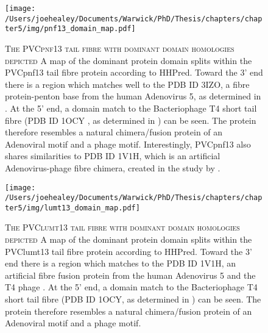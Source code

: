 \begin{figure}[h]
	\centering
	\texttt{[image: /Users/joehealey/Documents/Warwick/PhD/Thesis/chapters/chapter5/img/pnf13\_domain\_map.pdf]}
	\captionsetup{singlelinecheck=off, justification=justified, font=footnotesize, aboveskip=0pt}
	\caption[The domain structure of the PVCpnf13 tail fibre protein]{\textsc{\normalsize The PVCpnf13 tail fibre with dominant domain homologies depicted}\vspace{0.1cm} \newline A map of the dominant protein domain splits within the PVCpnf13 tail fibre protein according to HHPred. Toward the 3' end there is a region which matches well to the PDB ID 3IZO, a fibre protein-penton base from the human Adenovirus 5, as determined in \cite{Liu2011}. At the 5' end, a domain match to the Bacteriophage T4 short tail fibre (PDB ID 1OCY , as determined in \cite{Thomassen2003}) can be seen. The protein therefore resembles a natural chimera/fusion protein of an Adenoviral motif and a phage motif. Interestingly, PVCpnf13 also shares similarities to PDB ID 1V1H, which is an artificial Adenovirus-phage fibre chimera, created in the study by \cite{Papanikolopoulou2004}.}
	\label{pnfdomains}
	\end{figure}
\begin{figure}[h]
	\centering
	\texttt{[image: /Users/joehealey/Documents/Warwick/PhD/Thesis/chapters/chapter5/img/lumt13\_domain\_map.pdf]}
	\captionsetup{singlelinecheck=off, justification=justified, font=footnotesize, aboveskip=0pt}
	\caption[The domain structure of the PVClumt13 tail fibre protein]{\textsc{\normalsize The PVClumt13 tail fibre with dominant domain homologies depicted}\vspace{0.1cm} \newline A map of the dominant protein domain splits within the PVClumt13 tail fibre protein according to HHPred. Toward the 3' end there is a region which matches to the PDB ID 1V1H, an artificial fibre fusion protein from the human Adenovirus 5 and the T4 phage \cite{Papanikolopoulou2004}. At the 5' end, a domain match to the Bacteriophage T4 short tail fibre (PDB ID 1OCY, as determined in \cite{Thomassen2013}) can be seen. The protein therefore resembles a natural chimera/fusion protein of an Adenoviral motif and a phage motif.}
	\label{lumtdomains}
\end{figure}



